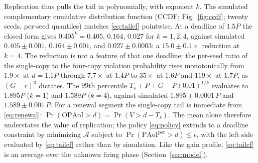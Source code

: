 \documentclass[twocolumn,3p,times,procedia]{elsarticle}
\theoremstyle{plain}
\theoremstyle{remark}
\newcommand{\OPAoI}{\mathrm{OPAoI}}
\newcommand{\PAoIper}{\mathrm{PAoI}^{\mathrm{per}}}
\begin{document}
Replication thus pulls the tail in polynomially, with exponent $k$.
The simulated complementary cumulative distribution function (CCDF;
Fig.~\ref{fig:ccdf}; twenty seeds, per-seed
quantiles) matches \eqref{eq:tailcf} pointwise. At a deadline of $1.5P$
the closed form gives $0.405^{k}=0.405,\,0.164,\,0.027$ for
$k{=}1,2,4$, against simulated $0.405\pm0.001$, $0.164\pm0.001$, and
$0.027\pm0.0003$: a $15.0\pm0.1\times$ reduction at $k{=}4$. The
reduction is not a feature of that one deadline: the per-seed ratio of
the single-copy to the four-copy violation probability rises
monotonically from $1.9\times$ at $d{=}1.1P$ through $7.7\times$ at
$1.4P$ to $35\times$ at $1.6P$ and $119\times$ at $1.7P$, as
$(G-r)^{3}$ dictates. The $99$th percentile $T_s+P+G-P(0.01)^{1/k}$
evaluates to $1.895P$ ($k{=}1$) and $1.589P$ ($k{=}4$), against
simulated $1.895\pm0.0001\,P$ and $1.589\pm0.001\,P$. For a renewal
segment the single-copy tail is immediate from \eqref{eq:renewal}:
$\Pr(\OPAoI>d)=\Pr(V>d-T_s)$. The mean alone therefore understates the
value of replication; the policy \eqref{eq:policy} extends to a deadline
constraint by minimizing $\mathcal{A}$ subject to
$\Pr(\PAoIper>d)\le\epsilon$, with the left side evaluated by
\eqref{eq:tailcf} rather than by simulation. Like the gain profile,
\eqref{eq:tailcf} is an average over the unknown firing phase
(Section~\ref{sec:model}).


\end{document}
